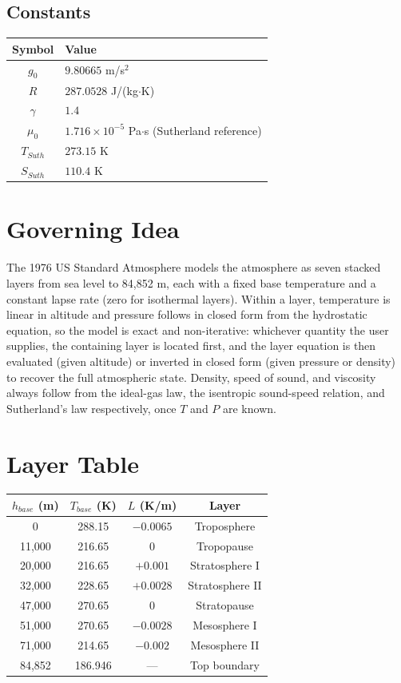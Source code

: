 \subsection*{Constants}

\begin{center}
\begin{tabular}{@{}cl@{}}
\toprule
Symbol & Value \\
\midrule
$g_0$ & $9.80665$ m/s$^2$ \\
$R$ & $287.0528$ J/(kg$\cdot$K) \\
$\gamma$ & $1.4$ \\
$\mu_0$ & $1.716\times10^{-5}$ Pa$\cdot$s (Sutherland reference) \\
$T_{Suth}$ & $273.15$ K \\
$S_{Suth}$ & $110.4$ K \\
\bottomrule
\end{tabular}
\end{center}

\section{Governing Idea}

The 1976 US Standard Atmosphere models the atmosphere as seven stacked
layers from sea level to 84{,}852 m, each with a fixed base temperature
and a constant lapse rate (zero for isothermal layers). Within a layer,
temperature is linear in altitude and pressure follows in closed form
from the hydrostatic equation, so the model is exact and non-iterative:
whichever quantity the user supplies, the containing layer is located
first, and the layer equation is then evaluated (given altitude) or
inverted in closed form (given pressure or density) to recover the full
atmospheric state. Density, speed of sound, and viscosity always follow
from the ideal-gas law, the isentropic sound-speed relation, and
Sutherland's law respectively, once $T$ and $P$ are known.

\section{Layer Table}

\begin{center}
\begin{tabular}{@{}cccc@{}}
\toprule
$h_{base}$ (m) & $T_{base}$ (K) & $L$ (K/m) & Layer \\
\midrule
0 & 288.15 & $-0.0065$ & Troposphere \\
11{,}000 & 216.65 & 0 & Tropopause \\
20{,}000 & 216.65 & $+0.001$ & Stratosphere I \\
32{,}000 & 228.65 & $+0.0028$ & Stratosphere II \\
47{,}000 & 270.65 & 0 & Stratopause \\
51{,}000 & 270.65 & $-0.0028$ & Mesosphere I \\
71{,}000 & 214.65 & $-0.002$ & Mesosphere II \\
84{,}852 & 186.946 & --- & Top boundary \\
\bottomrule
\end{tabular}
\end{center}

